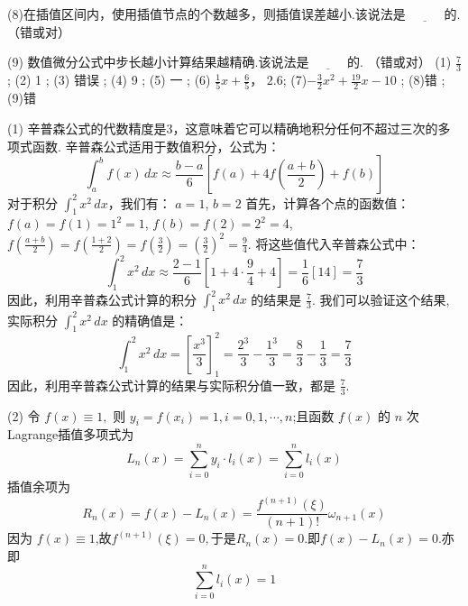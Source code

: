 \begin{tcolorbox}[colback=yellow!5!white,colframe=yellow!50!black,
 colbacktitle=yellow!75!black,title=填空题]
\vspace{\baselineskip}

(8)在插值区间内，使用插值节点的个数越多，则插值误差越小.该说法是 $\underline{\hspace{1cm}}$ 的.（错或对）

\vspace{\baselineskip}

(9) 数值微分公式中步长越小计算结果越精确.该说法是 $\underline{\hspace{1cm}}$ 的. （错或对）
 \tcblower
 (1) $\frac 73$ ;\; 
  (2) 1 ;\; 
   (3) 错误 ;\; 
    (4) 9 ;\; 
     (5) 一 ;\; 
      (6) $ \frac{1}{5} x + \frac{6}{5} $， $ 2.6 $;\; 
       (7)$-\frac{3}{2} x^{2}+\frac{19}{2} x-10$ ;\; 
        (8)错 ;\; 
         (9)错\; 
 \end{tcolorbox}



(1) 辛普森公式的代数精度是3，这意味着它可以精确地积分任何不超过三次的多项式函数.
辛普森公式适用于数值积分，公式为：
$$
\int_{a}^{b} f(x) \, dx \approx \frac{b - a}{6} \left[ f(a) + 4 f\left( \frac{a + b}{2} \right) + f(b) \right]
$$
对于积分 $\displaystyle\int_{1}^{2} x^2 \, dx$，我们有： $a = 1$, $b = 2$
首先，计算各个点的函数值：$f(a) = f(1) = 1^2 = 1$, $f(b) = f(2) = 2^2 = 4$,
$f\left( \frac{a + b}{2} \right) = f\left( \frac{1 + 2}{2} \right) = f\left( \frac{3}{2} \right) = \left( \frac{3}{2} \right)^2 = \frac{9}{4}$.
将这些值代入辛普森公式中：
$$
\int_{1}^{2} x^2 \, dx \approx \frac{2 - 1}{6} \left[ 1 + 4 \cdot \frac{9}{4} + 4 \right]= \frac{1}{6} \left[ 14 \right]
= \frac{7}{3}
$$
因此，利用辛普森公式计算的积分 $\displaystyle\int_{1}^{2} x^2 \, dx$ 的结果是 $\frac{7}{3}$.
我们可以验证这个结果,实际积分 $\displaystyle\int_{1}^{2} x^2 \, dx$ 的精确值是：
$$
\int_{1}^{2} x^2 \, dx = \left[ \frac{x^3}{3} \right]_{1}^{2} = \frac{2^3}{3} - \frac{1^3}{3} = \frac{8}{3} - \frac{1}{3} = \frac{7}{3}
$$
因此，利用辛普森公式计算的结果与实际积分值一致，都是 $\frac{7}{3}$.

\vspace{\baselineskip}

(2) 令 $ f(x)\equiv1,$ 则 $ y_{i}=f\left(x_{i}\right)=1, i=0,1, \cdots, n $;且函数 $ f(x) $ 的 $ n $ 次Lagrange插值多项式为
$$
L_{n}(x)=\sum_{i=0}^{n}  y_i \cdot l_{i}(x)=\sum_{i=0}^{n}   l_{i}(x)
$$
插值余项为
$$
R_{n}(x)=f(x)-L_{n}(x)=\frac{f^{(n+1)}(\xi)}{(n+1) !}  \omega_{n+1}(x)
$$
因为 $f(x)\equiv 1$,故$f^{(n+1)}(\xi)=0,$于是$R_{n}(x)=0 .$即$f(x)-L_{n}(x)=0$.亦即
$$
\sum_{i=0}^{n}  l_{i}(x)=1
$$

\vspace{\baselineskip}

